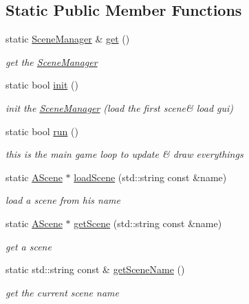 \subsection*{Static Public Member Functions}
\begin{DoxyCompactItemize}
\item 
static \hyperlink{class_scene_manager}{Scene\+Manager} \& \hyperlink{class_scene_manager_a8467467ece15e24aebc95cc6141a6200}{get} ()
\begin{DoxyCompactList}\small\item\em get the \hyperlink{class_scene_manager}{Scene\+Manager} \end{DoxyCompactList}\item 
static bool \hyperlink{class_scene_manager_afdfd47d1316c64d753bf192d513cbb6e}{init} ()
\begin{DoxyCompactList}\small\item\em init the \hyperlink{class_scene_manager}{Scene\+Manager} (load the first scene\& load gui) \end{DoxyCompactList}\item 
static bool \hyperlink{class_scene_manager_a7d88d1c5611d84ca9a08bda535ff46f1}{run} ()
\begin{DoxyCompactList}\small\item\em this is the main game loop to update \& draw everythings \end{DoxyCompactList}\item 
static \hyperlink{class_a_scene}{A\+Scene} $\ast$ \hyperlink{class_scene_manager_ad9b4726f3b184fe06d4753513f525a44}{load\+Scene} (std\+::string const \&name)
\begin{DoxyCompactList}\small\item\em load a scene from his name \end{DoxyCompactList}\item 
static \hyperlink{class_a_scene}{A\+Scene} $\ast$ \hyperlink{class_scene_manager_ab573cd5f6d2b7220544bc5c6f52e12a1}{get\+Scene} (std\+::string const \&name)
\begin{DoxyCompactList}\small\item\em get a scene \end{DoxyCompactList}\item 
static std\+::string const  \& \hyperlink{class_scene_manager_afb20a5ed55b7238d1789e33760e63028}{get\+Scene\+Name} ()
\begin{DoxyCompactList}\small\item\em get the current scene name \end{DoxyCompactList}\item 

\end{DoxyCompactItemize}
